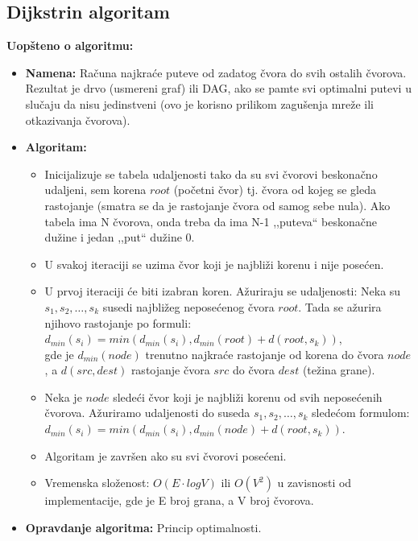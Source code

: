 \documentclass[a4paper]{article}
\begin{document}
    \subsection{Dijkstrin algoritam}
        \noindent \textbf{Uopšteno o algoritmu:}
        \begin{itemize}
            \item \textbf{Namena:} Računa najkraće puteve od zadatog čvora do svih ostalih
                  čvorova. Rezultat je drvo (usmereni graf) ili DAG, ako se pamte
                  svi optimalni putevi u slučaju da nisu jedinstveni (ovo je korisno
                  prilikom zagušenja mreže ili otkazivanja čvorova).
            \item \textbf{Algoritam:} 
                  \begin{itemize}
                      \item Inicijalizuje se tabela udaljenosti tako da su svi čvorovi 
                            beskonačno udaljeni, sem korena $root$ (početni čvor) tj. čvora od kojeg 
                            se gleda rastojanje (smatra se da je rastojanje čvora od samog sebe nula).
                            Ako tabela ima N čvorova, onda treba da ima N-1 ,,puteva``
                            beskonačne dužine i jedan ,,put`` dužine 0.
                      \item U svakoj iteraciji se uzima čvor koji je najbliži korenu i nije posećen.
                      \item U prvoj iteraciji će biti izabran koren.
                            Ažuriraju se udaljenosti: Neka su $s_1, s_2, \dots, s_k$ susedi
                            najbližeg neposećenog čvora $root$. Tada se ažurira njihovo rastojanje
                            po formuli: \\
                            $d_{min}(s_i) = min(d_{min}(s_i), d_{min}(root) + d(root, s_k))$, \\
                            gde je $d_{min}(node)$ trenutno najkraće rastojanje od korena do čvora $node$, a 
                            $d(src, dest)$ rastojanje čvora $src$ do čvora $dest$ (težina grane). 
                      \item Neka je $node$ sledeći čvor koji je najbliži korenu od svih neposećenih čvorova.
                            Ažuriramo udaljenosti do suseda $s_1, s_2, \dots, s_k$ sledećom formulom: \\
                            $d_{min}(s_i) = min(d_{min}(s_i), d_{min}(node) + d(root, s_k))$.
                      \item Algoritam je završen ako su svi čvorovi posećeni.
                      \item Vremenska složenost: $O(E\cdot log{V})$ ili $O(V^{2})$ u zavisnosti
                            od implementacije, gde je E broj grana, a V broj čvorova.
                  \end{itemize} 
            \item \textbf{Opravdanje algoritma:} Princip optimalnosti.
        \end{itemize}
\end{document}
